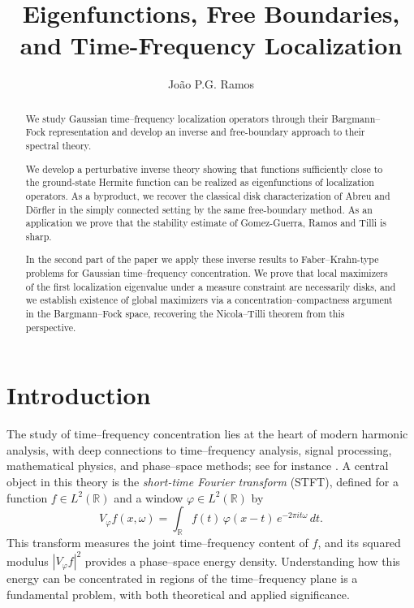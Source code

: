 \documentclass[a4paper,11pt,reqno]{amsart}
\title[Time-frequency localization]{Eigenfunctions, Free Boundaries, and Time-Frequency Localization}
\author{Jo{\~a}o P.G. Ramos}
\numberwithin{equation}{section}
\theoremstyle{plain} %
\theoremstyle{definition} %
\theoremstyle{remark}
\begin{document}
\maketitle 
\begin{abstract}
We study Gaussian time--frequency localization operators through their Bargmann--Fock representation and develop an inverse and free-boundary approach to their spectral theory.

We develop a perturbative inverse theory showing that functions sufficiently close to the ground-state Hermite function can be realized as eigenfunctions of localization operators. As a byproduct, we recover the classical disk characterization of Abreu and D\"orfler in the simply connected setting by the same free-boundary method. As an application we prove that the stability estimate of Gomez-Guerra, Ramos and Tilli is sharp.

In the second part of the paper we apply these inverse results to Faber--Krahn-type problems for Gaussian time--frequency concentration. We prove that local maximizers of the first localization eigenvalue under a measure constraint are necessarily disks, and we establish existence of global maximizers via a concentration--compactness argument in the Bargmann--Fock space, recovering the Nicola--Tilli theorem from this perspective.
\end{abstract}

\section{Introduction}

The study of time--frequency concentration lies at the heart of modern harmonic analysis, with deep connections to time--frequency analysis, signal processing, mathematical physics, and phase--space methods; see for instance \cite{Grochenig,Mallat,Folland}. A central object in this theory is the \emph{short-time Fourier transform} (STFT), defined for a function $f \in L^2(\mathbb{R})$ and a window $\varphi \in L^2(\mathbb{R})$ by
\[
V_\varphi f(x,\omega) = \int_{\mathbb{R}} f(t)\,\varphi(x-t)\,e^{-2\pi i t \omega}\,dt.
\]
This transform measures the joint time--frequency content of $f$, and its squared modulus $|V_\varphi f|^2$ provides a phase--space energy density. Understanding how this energy can be concentrated in regions of the time--frequency plane is a fundamental problem, with both theoretical and applied significance.
\end{document}
